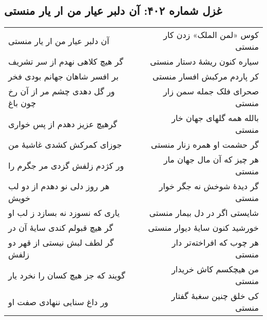 \begin{center}
\section*{غزل شماره ۴۰۲: آن دلبر عیار من ار یار منستی}
\label{sec:402}
\begin{longtable}{l p{0.5cm} r}
آن دلبر عیار من ار یار منستی
&&
کوس «لمن الملک» زدن کار منستی
\\
گر هیچ کلاهی نهدم از سر تشریف
&&
سیاره کنون ریشهٔ دستار منستی
\\
بر افسر شاهان جهانم بودی فخر
&&
کر پاردم مرکبش افسار منستی
\\
ور گل دهدی چشم مر از آن رخ چون باغ
&&
صحرای فلک جمله سمن زار منستی
\\
گرهیچ عزیز دهدم از پس خواری
&&
بالله همه گلهای جهان خار منستی
\\
جوزای کمرکش کشدی غاشیهٔ من
&&
گر حشمت او همره زنار منستی
\\
ور کژدم زلفش گزدی مر جگرم را
&&
هر چیز که آن مال جهان مار منستی
\\
هر روز دلی نو دهدم از دو لب خویش
&&
گر دیدهٔ شوخش نه جگر خوار منستی
\\
یاری که نسوزد نه بسازد ز لب او
&&
شایستی اگر در دل بیمار منستی
\\
گر هیچ قبولم کندی سایهٔ آن در
&&
خورشید کنون سایهٔ دیوار منستی
\\
گر لطف لبش نیستی از قهر دو زلفش
&&
هر چوب که افراخته‌تر دار منستی
\\
گویند که جز هیچ کسان را نخرد یار
&&
من هیچکسم کاش خریدار منستی
\\
ور داغ سنایی ننهادی صفت او
&&
کی خلق چنین سغبهٔ گفتار منستی
\\
\end{longtable}
\end{center}
